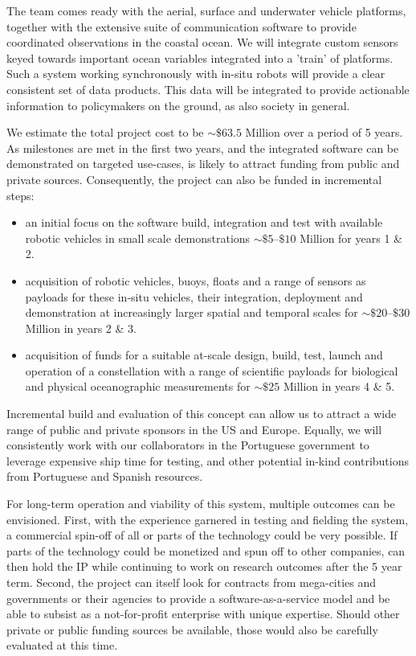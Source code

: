 \documentclass[12pt]{article}
\begin{document}
The \pro team comes ready with the aerial, surface and underwater
vehicle platforms, together with the extensive suite of communication
software to provide coordinated observations in the coastal ocean. We
will integrate custom sensors keyed towards important ocean variables
integrated into a 'train' of \sml platforms.  Such a system working
synchronously with in-situ robots will provide a clear consistent set
of data products. This data will be integrated to provide actionable
information to policymakers on the ground, as also society in general.

We estimate the total project cost to be $\sim \$63.5$ Million over a
period of 5 years. As milestones are met in the first two years, and
the integrated software can be demonstrated on targeted use-cases,
\pro is likely to attract funding from public and private
sources. Consequently, the project can also be funded in incremental
steps:

\begin{itemize}[noitemsep,topsep=0pt,parsep=0pt,partopsep=0pt]

\item an initial focus on the software build, integration and test
  with available robotic vehicles in small scale demonstrations $\sim
  \$5$--$\$10$ Million for years 1 \& 2.

\item acquisition of robotic vehicles, buoys, floats and a range of
  sensors as payloads for these in-situ vehicles, their integration,
  deployment and demonstration at increasingly larger spatial and
  temporal scales for $\sim \$20$--$\$30$ Million in years 2 \& 3.

\item acquisition of funds for a suitable at-scale design, build,
  test, launch and operation of a \sml constellation with a range of
  scientific payloads for biological and physical oceanographic
  measurements for $\sim \$25$ Million in years 4 \& 5.

\end{itemize}  

Incremental build and evaluation of this concept can allow us to
attract a wide range of public and private sponsors in the US and
Europe.  Equally, we will consistently work with our collaborators in
the Portuguese government to leverage expensive ship time for testing,
and other potential in-kind contributions from Portuguese and Spanish
resources.

For long-term operation and viability of this system, multiple
outcomes can be envisioned. First, with the experience garnered in
testing and fielding the system, a commercial spin-off of all or parts
of the technology could be very possible. If parts of the technology
could be monetized and spun off to other companies, \pro can then hold
the IP while continuing to work on research outcomes after the 5 year
term. Second, the project can itself look for contracts from
mega-cities and governments or their agencies to provide a
software-as-a-service model and be able to subsist as a not-for-profit
enterprise with unique expertise. Should other private or public
funding sources be available, those would also be carefully evaluated
at this time.
\end{document}
